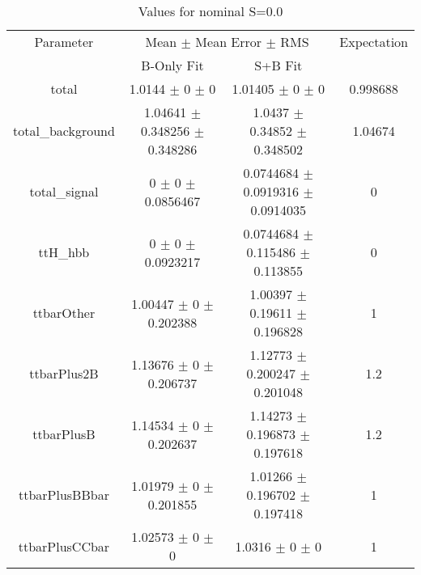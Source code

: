 \begin{table}
\centering
\caption{Values for nominal S=0.0}
\begin{tabular}{cccc}
\toprule
Parameter & \multicolumn{2}{c}{Mean $\pm$ Mean Error $\pm$ RMS} & Expectation\\
 & B-Only Fit & S+B Fit & \\
\midrule
total & \num{1.0144} $\pm$ \num{0} $\pm$ \num{0} & \num{1.01405} $\pm$ \num{0} $\pm$ \num{0} & \num{0.998688}\\
total\_background & \num{1.04641} $\pm$ \num{0.348256} $\pm$ \num{0.348286} & \num{1.0437} $\pm$ \num{0.34852} $\pm$ \num{0.348502} & \num{1.04674}\\
total\_signal & \num{0} $\pm$ \num{0} $\pm$ \num{0.0856467} & \num{0.0744684} $\pm$ \num{0.0919316} $\pm$ \num{0.0914035} & \num{0}\\
ttH\_hbb & \num{0} $\pm$ \num{0} $\pm$ \num{0.0923217} & \num{0.0744684} $\pm$ \num{0.115486} $\pm$ \num{0.113855} & \num{0}\\
ttbarOther & \num{1.00447} $\pm$ \num{0} $\pm$ \num{0.202388} & \num{1.00397} $\pm$ \num{0.19611} $\pm$ \num{0.196828} & \num{1}\\
ttbarPlus2B & \num{1.13676} $\pm$ \num{0} $\pm$ \num{0.206737} & \num{1.12773} $\pm$ \num{0.200247} $\pm$ \num{0.201048} & \num{1.2}\\
ttbarPlusB & \num{1.14534} $\pm$ \num{0} $\pm$ \num{0.202637} & \num{1.14273} $\pm$ \num{0.196873} $\pm$ \num{0.197618} & \num{1.2}\\
ttbarPlusBBbar & \num{1.01979} $\pm$ \num{0} $\pm$ \num{0.201855} & \num{1.01266} $\pm$ \num{0.196702} $\pm$ \num{0.197418} & \num{1}\\
ttbarPlusCCbar & \num{1.02573} $\pm$ \num{0} $\pm$ \num{0} & \num{1.0316} $\pm$ \num{0} $\pm$ \num{0} & \num{1}\\
\bottomrule
\end{tabular}
\end{table}